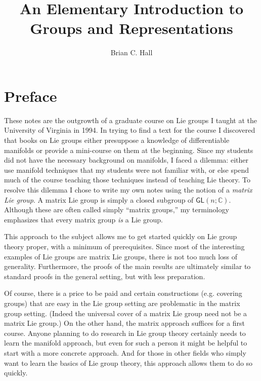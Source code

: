 \documentclass[12pt]{amsbook}
\theoremstyle{plain}
\numberwithin{equation}{chapter}
\numberwithin{theorem}{chapter}
\begin{document}
\frontmatter
\title[Groups and Representations]{An Elementary Introduction to Groups and Representations}
\author{Brian C. Hall}
\address{University of Notre Dame\\
Department of Mathematics\\
Notre Dame IN 46556 USA}
\maketitle
\tableofcontents

\pagestyle{plain}

\section{Preface}

These notes are the outgrowth of a graduate course on Lie groups I taught at
the University of Virginia in 1994. In trying to find a text for the course I
discovered that books on Lie groups either presuppose a knowledge of
differentiable manifolds or provide a mini-course on them at the beginning.
Since my students did not have the necessary background on manifolds, I faced
a dilemma: either use manifold techniques that my students were not familiar
with, or else spend much of the course teaching those techniques instead of
teaching Lie theory. To resolve this dilemma I chose to write my own notes
using the notion of a \textit{matrix Lie group}. A matrix Lie group is simply
a closed subgroup of $\mathsf{GL}(n;\mathbb{C}).$ Although these are often
called simply ``matrix groups,'' my terminology emphasizes that every matrix
group \textit{is} a Lie group.

This approach to the subject allows me to get started quickly on Lie group
theory proper, with a minimum of prerequisites. Since most of the interesting
examples of Lie groups are matrix Lie groups, there is not too much loss of
generality. Furthermore, the proofs of the main results are ultimately similar
to standard proofs in the general setting, but with less preparation.

Of course, there is a price to be paid and certain constructions (e.g.
covering groups) that are easy in the Lie group setting are problematic in the
matrix group setting. (Indeed the universal cover of a matrix Lie group need
not be a matrix Lie group.) On the other hand, the matrix approach suffices
for a first course. Anyone planning to do research in Lie group theory
certainly needs to learn the manifold approach, but even for such a person it
might be helpful to start with a more concrete approach. And for those in
other fields who simply want to learn the basics of Lie group theory, this
approach allows them to do so quickly.
\end{document}
